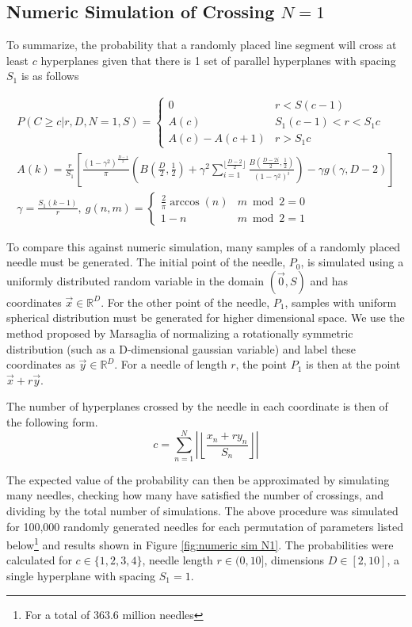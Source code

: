 \documentclass{article}
\begin{document}
\subsection{Numeric Simulation of Crossing $N=1$} \label{s:n=1 numeric}
To summarize, the probability that a randomly placed line segment will cross at least $c$
hyperplanes given that there is 1 set of parallel hyperplanes with spacing $S_1$ is as follows

\begin{gather*}
	P(C\ge c | r, D, N=1, S) = \begin{cases}
		0 & r < S(c-1) \\ 
		A(c)  & S_1 (c-1) < r < S_1 c \\
		A(c) - A(c+1) & r > S_1c		
	\end{cases} \\
	A(k) = \frac{r}{S_1} \left[\frac{(1-\gamma^2)^{\frac{D-1}{2}}}{\pi} \left(B\left(\frac{D}{2}, \frac{1}{2} \right) + \gamma^2 \sum_{i=1}^{\lfloor \frac{D-2}{2} \rfloor}\frac{B(\frac{D-2i}{2}, \frac{1}{2})}{(1-\gamma^2)^i}\right) - \gamma g(\gamma, D-2) \right] \\
	\gamma = \frac{S_1(k-1)}{r},\ g(n, m) = \begin{cases}
		\frac{2}{\pi}\arccos(n) & m\bmod 2 = 0 \\
		1-n & m \bmod 2 = 1
	\end{cases}
\end{gather*}

To compare this against numeric simulation, many samples of a randomly placed needle must be generated.
The initial point of the needle, $P_0$, is simulated using a uniformly distributed random variable in 
the domain $(\vec 0, S)$ and has coordinates $\vec x \in \mathbb{R}^D$. For the other point of the needle, $P_1$, samples 
with uniform spherical distribution must be generated for higher dimensional space. We use the method
proposed by Marsaglia  of normalizing a rotationally symmetric distribution 
(such as a D-dimensional gaussian variable) and label these coordinates as $\vec y \in \mathbb{R}^D$. For a needle of
length $r$, the point $P_1$ is then at the point $\vec x + r \vec y$.

The number of hyperplanes crossed by the needle in each coordinate is then of the following form.
\begin{equation}
	c = \sum_{n=1}^{N} \left|\left\lfloor \frac{x_n+r y_n}{S_n} \right\rfloor\right|
\end{equation}

The expected value of the probability can then be approximated by simulating many needles, checking
how many have satisfied the number of crossings, and dividing by the total number of simulations.
The above procedure was simulated for 100,000 randomly generated needles for each permutation of parameters
listed below\footnote{For a total of 363.6 million needles} and results shown in Figure \ref{fig:numeric sim N1}. The probabilities were calculated for
$c\in\{1,2,3,4\}$, needle length $r\in(0, 10]$, dimensions $D\in[2, 10]$, a single hyperplane with
spacing $S_1=1$.
\end{document}
